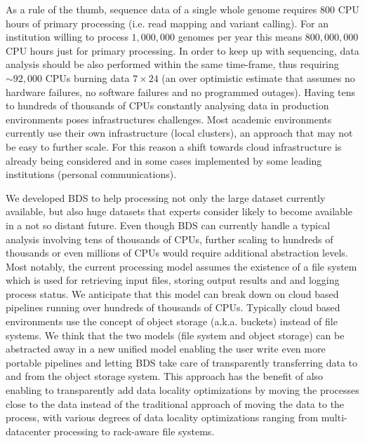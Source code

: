 As a rule of the thumb, sequence data of a single whole genome requires $800$ CPU hours of primary processing (i.e. read mapping and variant calling).
For an institution willing to process $1,000,000$ genomes per year this means $800,000,000$ CPU hours just for primary processing.
In order to keep up with sequencing, data analysis should be also performed within the same time-frame, thus requiring $\sim 92,000$ CPUs burning data $7 \times 24$ (an over optimistic estimate that assumes no hardware failures, no software failures and no programmed outages).
Having tens to hundreds of thousands of CPUs constantly analysing data in production environments poses infrastructures challenges.
Most academic environments currently use their own infrastructure (local clusters), an approach that may not be easy to further scale.
For this reason a shift towards cloud infrastructure is already being considered and in some cases implemented by some leading institutions (personal communications).

We developed BDS to help processing not only the large dataset currently available, but also huge datasets that experts consider likely to become available in a not so distant future.
Even though BDS can currently handle a typical analysis involving tens of thousands of CPUs, further scaling to hundreds of thousands or even millions of CPUs would require additional abstraction levels.
Most notably, the current processing model assumes the existence of a file system which is used for retrieving input files, storing output results and and logging process status.
We anticipate that this model can break down on cloud based pipelines running over hundreds of thousands of CPUs.
Typically cloud based environments use the concept of object storage (a.k.a. buckets) instead of file systems.
We think that the two models (file system and object storage) can be abstracted away in a new unified model enabling the user write even more portable pipelines and letting BDS take care of transparently transferring data to and from the object storage system.
This approach has the benefit of also enabling to transparently add data locality optimizations by moving the processes close to the data instead of the traditional approach of moving the data to the process, with various degrees of data locality optimizations ranging from multi-datacenter processing to rack-aware file systems.

